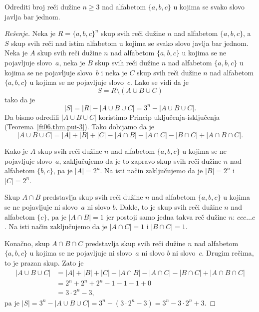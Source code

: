 \begin{EX}
  Odrediti broj re\v ci du\v zine $n \ge 3$ nad alfabetom $\{a, b, c\}$ u kojima se svako slovo javlja bar jednom.
\end{EX}
\begin{proof}[Re\v senje]
  Neka je $R = \{a, b, c\}^n$ skup svih re\v ci du\v zine $n$ nad alfabetom $\{a, b, c\}$, a $S$ skup svih re\v ci
  nad istim alfabetom u kojima se svako slovo javlja bar jednom. Neka je $A$ skup svih re\v ci du\v zine $n$ nad
  alfabetom $\{a, b, c\}$ u kojima se ne pojavljuje slovo~$a$, neka je $B$ skup svih re\v ci du\v zine $n$ nad
  alfabetom $\{a, b, c\}$ u kojima se ne pojavljuje slovo~$b$ i neka je $C$ skup svih re\v ci du\v zine $n$ nad
  alfabetom $\{a, b, c\}$ u kojima se ne pojavljuje slovo~$c$. Lako se vidi da je
  $$
    S = R \setminus (A \cup B \cup C)
  $$
  tako da je
  $$
    |S| = |R| - |A \cup B \cup C| = 3^n - |A \cup B \cup C|.
  $$
  Da bismo odredili $|A \cup B \cup C|$ koristimo Princip uklju\v cenja-isklju\v cenja (Te\-o\-re\-ma~\ref{ft06.thm.pui-3}).
  Tako dobijamo da je
  $$
    |A \cup B \cup C| = |A| + |B| + |C| - |A \cap B| - |A \cap C| - |B \cap C| + |A \cap B \cap C|.
  $$

  Kako je $A$ skup svih re\v ci du\v zine $n$ nad alfabetom $\{a, b, c\}$ u kojima se ne pojavljuje slovo~$a$, zaklju\v cujemo
  da je to zapravo skup svih re\v ci du\v zine $n$ nad alfabetom $\{b, c\}$, pa je $|A| = 2^n$. Na isti na\v cin zaklju\v cujemo
  da je $|B| = 2^n$ i $|C| = 2^n$.
  
  Skup $A \cap B$ predstavlja skup svih re\v ci du\v zine $n$ nad alfabetom $\{a, b, c\}$ u kojima se ne pojavljuje ni slovo~$a$
  ni slovo $b$. Dakle, to je skup svih re\v ci du\v zine $n$ nad alfabetom $\{c\}$, pa je $|A \cap B| = 1$ jer postoji samo
  jedna takva re\v c du\v zine $n$: $ccc\ldots c$. Na isti na\v cin zaklju\v cujemo
  da je $|A \cap C| = 1$ i $|B \cap C| = 1$.
  
  Kona\v cno, skup $A \cap B \cap C$ predstavlja skup svih re\v ci du\v zine $n$ nad alfabetom $\{a, b, c\}$ u kojima se ne
  pojavljuje ni slovo~$a$ ni slovo $b$ ni slovo~$c$. Drugim re\v cima, to je prazan skup. Zato je
  \begin{align*}
    |A \cup B \cup C| &= |A| + |B| + |C| - |A \cap B| - |A \cap C| - |B \cap C| + |A \cap B \cap C|\\
                      &= 2^n + 2^n + 2^n - 1 - 1 - 1 + 0\\
                      &= 3 \cdot 2^n - 3,
  \end{align*}
  pa je $|S| = 3^n - |A \cup B \cup C| = 3^n - (3 \cdot 2^n - 3) = 3^n - 3 \cdot 2^n + 3$.
\end{proof}


